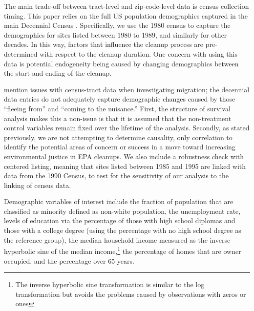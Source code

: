 \documentclass[12pt]{article}
\begin{document}
The main trade-off between tract-level and zip-code-level data is census collection timing. This paper relies on the full US population demographics captured in the main Decennial Census \parencite{USCensus}. Specifically, we use the 1980 census to capture the demographics for sites listed between 1980 to 1989, and similarly for other decades. In this way, factors that influence the cleanup process are pre-determined with respect to the cleanup duration. One concern with using this data is potential endogeneity being caused by changing demographics between the start and ending of the cleanup. {\textcite{Depro2015} mention issues with census-tract data when investigating migration; the decennial data entries do not adequately capture demographic changes caused by those ``fleeing from'' and ``coming to the nuisance.'' First, the structure of survival analysis makes this a non-issue is that it is assumed that the non-treatment control variables remain fixed over the lifetime of the analysis. Secondly, as stated previously, we are not attempting to determine causality, only correlation to identify the potential areas of concern or success in a move toward increasing environmental justice in EPA cleanups. We also include a robustness check with centered listing, meaning that sites listed between 1985 and 1995 are linked with data from the 1990 Census, to test for the sensitivity of our analysis to the linking of census data. 


Demographic variables of interest include the fraction of population that are classified as minority defined as non-white population, the unemployment rate, levels of education via the percentage of those with high school diplomas and those with a college degree (using the percentage with no high school degree as the reference group), the median household income measured as the inverse hyperbolic sine of the median income,\footnote{The inverse hyperbolic sine transformation is similar to the log transformation but avoids the problems caused by observations with zeros or ones} the percentage of homes that are owner occupied, and the percentage over 65 years. 

}
\end{document}
